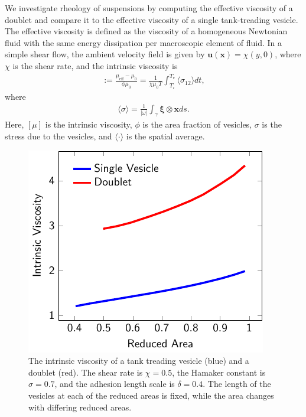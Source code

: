 \documentclass[%
preprint,
 amsmath,amssymb,
 aps,
]{revtex4-1}
\newcommand{\uu}{\mathbf{u}}
\newcommand{\xx}{\mathbf{x}}
\newcommand{\xxi}{\boldsymbol{\xi}}
\begin{document}
We investigate rheology of suspensions by computing the effective
viscosity of a doublet and compare it to the effective viscosity of a
single tank-treading vesicle. The effective viscosity is defined as the
viscosity of a homogeneous Newtonian fluid with the same energy
dissipation per macroscopic element of fluid.  In a simple shear flow,
the ambient velocity field is given by $\uu(\xx) = \chi(y,0)$, where
$\chi$ is the shear rate, and the intrinsic viscosity is
\begin{align*}
  [\mu]:= \frac{\mu_{\mathrm{eff}} - \mu_0}{\phi \mu_0} = 
  \frac{1}{\chi \mu_0 T} \int_{T_i}^{T_e} 
  \langle \sigma_{12} \rangle dt,
\end{align*}
where
\begin{align*}
  \langle \sigma \rangle = \frac{1}{|\omega|} \int_{\gamma}
    \xxi \otimes \xx ds.
\end{align*}
Here, $[\mu]$ is the intrinsic viscosity, $\phi$ is the area fraction of
vesicles, $\sigma$ is the stress due to the vesicles, and $\langle \cdot
\rangle$ is the spatial average.

\begin{figure}[htp]
  \includegraphics[scale=1]{figs/shear2Ves_adR4em1adS7em1Chi5em1.pdf}
  \caption{\label{fig:shearIntrinsicViscosity} The intrinsic viscosity
  of a tank treading vesicle (blue) and a doublet (red).  The shear rate
is $\chi = 0.5$, the Hamaker constant is $\sigma = 0.7$, and the
adhesion length scale is $\delta = 0.4$.  The length of the vesicles at
each of the reduced areas is fixed, while the area changes with
differing reduced areas.}
\end{figure}
\end{document}
